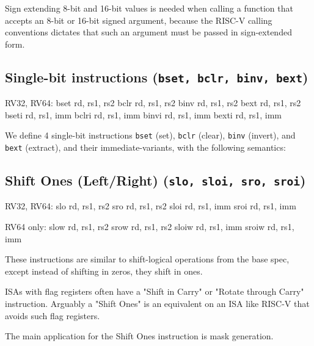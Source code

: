 Sign extending 8-bit and 16-bit values is needed when calling a function that
accepts an 8-bit or 16-bit signed argument, because the RISC-V calling
conventions dictates that such an argument must be passed in sign-extended
form.


\subsection{Single-bit instructions (\texttt{bset, bclr, binv, bext})}

\begin{rvb}
  RV32, RV64:
    bset  rd, rs1, rs2
    bclr  rd, rs1, rs2
    binv  rd, rs1, rs2
    bext  rd, rs1, rs2
    bseti rd, rs1, imm
    bclri rd, rs1, imm
    binvi rd, rs1, imm
    bexti rd, rs1, imm
\end{rvb}

We define 4 single-bit instructions \texttt{bset} (set), \texttt{bclr} (clear),
\texttt{binv} (invert), and \texttt{bext} (extract), and their immediate-variants,
with the following semantics:




\subsection{Shift Ones (Left/Right) (\texttt{slo,\ sloi,\ sro,\ sroi})}

\begin{rvb}
  RV32, RV64:
    slo  rd, rs1, rs2
    sro  rd, rs1, rs2
    sloi rd, rs1, imm
    sroi rd, rs1, imm

  RV64 only:
    slow  rd, rs1, rs2
    srow  rd, rs1, rs2
    sloiw rd, rs1, imm
    sroiw rd, rs1, imm
\end{rvb}

These instructions are similar to shift-logical operations from the base
spec, except instead of shifting in zeros, they shift in ones.



ISAs with flag registers often have a "Shift in Carry" or "Rotate through Carry" instruction.
Arguably a "Shift Ones" is an equivalent on an ISA like RISC-V that avoids such flag registers.

The main application for the Shift Ones instruction is mask generation.

